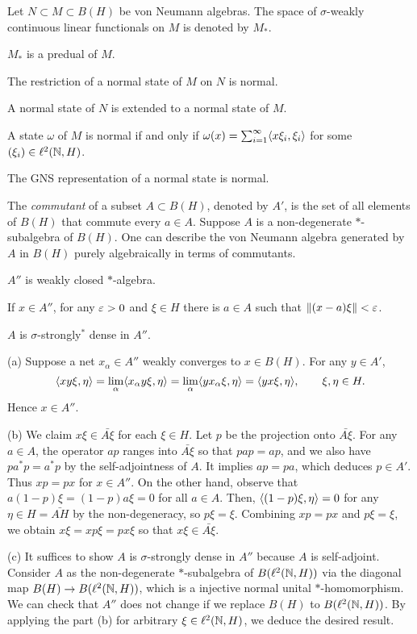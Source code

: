 \documentclass{../../large}
\begin{document}
\begin{prb}
Let $N\subset M\subset B(H)$ be von Neumann algebras.
The space of $\sigma$-weakly continuous linear functionals on $M$ is denoted by $M_*$.
\begin{parts}
\item $M_*$ is a predual of $M$.
\item The restriction of a normal state of $M$ on $N$ is normal.
\item A normal state of $N$ is extended to a normal state of $M$.
\item A state $\omega$ of $M$ is normal if and only if $\omega(x)=\sum_{i=1}^\infty\langle x\xi_i,\xi_i\rangle$ for some $(\xi_i)\in\ell^2(\mathbb{N},H)$.
\item The GNS representation of a normal state is normal.
\end{parts}
\end{prb}

\begin{prb}
The \emph{commutant} of a subset $A\subset B(H)$, denoted by $A'$, is the set of all elements of $B(H)$ that commute every $a\in A$.
Suppose $A$ is a non-degenerate $*$-subalgebra of $B(H)$.
One can describe the von Neumann algebra generated by $A$ in $B(H)$ purely algebraically in terms of commutants.
\begin{parts}
\item $A''$ is weakly closed $*$-algebra.
\item If $x\in A''$, for any $\varepsilon>0$ and $\xi\in H$ there is $a\in A$ such that $\|(x-a)\xi\|<\varepsilon$.
\item $A$ is $\sigma$-strongly$^*$ dense in $A''$.
\end{parts}
\end{prb}
\begin{pf}
(a)
Suppose a net $x_\alpha\in A''$ weakly converges to $x\in B(H)$.
For any $y\in A'$,
\[\langle xy\xi,\eta\rangle=\lim_\alpha\langle x_\alpha y\xi,\eta\rangle=\lim_\alpha\langle yx_\alpha\xi,\eta\rangle=\langle yx\xi,\eta\rangle,\qquad \xi,\eta\in H.\]
Hence $x\in A''$.

(b)
We claim $x\xi\in\bar{A\xi}$ for each $\xi\in H$.
Let $p$ be the projection onto $\bar{A\xi}$.
For any $a\in A$, the operator $ap$ ranges into $\bar{A\xi}$ so that $pap=ap$, and we also have $pa^*p=a^*p$ by the self-adjointness of $A$.
It implies $ap=pa$, which deduces $p\in A'$.
Thus $xp=px$ for $x\in A''$.
On the other hand, observe that $a(1-p)\xi=(1-p)a\xi=0$ for all $a\in A$.
Then, $\langle(1-p)\xi,\eta\rangle=0$ for any $\eta\in H=\bar{AH}$ by the non-degeneracy, so $p\xi=\xi$.
Combining $xp=px$ and $p\xi=\xi$, we obtain $x\xi=xp\xi=px\xi$ so that $x\xi\in\bar{A\xi}$.

(c)
It suffices to show $A$ is $\sigma$-strongly dense in $A''$ because $A$ is self-adjoint.
Consider $A$ as the non-degenerate $*$-subalgebra of $B(\ell^2(\mathbb{N},H))$ via the diagonal map $B(H)\to B(\ell^2(\mathbb{N},H))$, which is a injective normal unital $*$-homomorphism.
We can check that $A''$ does not change if we replace $B(H)$ to $B(\ell^2(\mathbb{N},H))$.
By applying the part (b) for arbitrary $\xi\in\ell^2(\mathbb{N},H)$, we deduce the desired result.
\end{pf}
\end{document}
